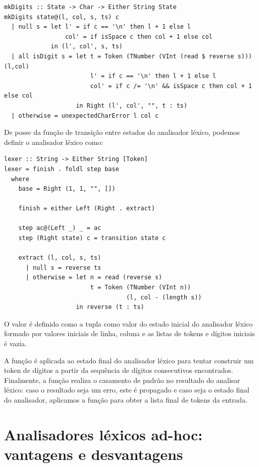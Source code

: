\begin{verbatim}
mkDigits :: State -> Char -> Either String State
mkDigits state@(l, col, s, ts) c
  | null s = let l' = if c == '\n' then l + 1 else l
                 col' = if isSpace c then col + 1 else col
             in (l', col', s, ts)
  | all isDigit s = let t = Token (TNumber (VInt (read $ reverse s))) (l,col)
                        l' = if c == '\n' then l + 1 else l
                        col' = if c /= '\n' && isSpace c then col + 1 else col
                    in Right (l', col', "", t : ts)
  | otherwise = unexpectedCharError l col c
\end{verbatim}

De posse da função de transição entre estados do analisador léxico,
podemos definir o analisador léxico como:

\begin{verbatim}
lexer :: String -> Either String [Token]
lexer = finish . foldl step base
  where
    base = Right (1, 1, "", [])

    finish = either Left (Right . extract)

    step ac@(Left _) _ = ac
    step (Right state) c = transition state c

    extract (l, col, s, ts)
      | null s = reverse ts
      | otherwise = let n = read (reverse s)
                        t = Token (TNumber (VInt n))
                                  (l, col - (length s))
                    in reverse (t : ts)
\end{verbatim}

O valor  é definido como a tupla
 como valor do estado inicial
do analisador léxico formado por valores iniciais de linha, coluna e
as listas de tokens e dígitos iniciais é vazia.

A função  é aplicada ao estado final
do analisador léxico para tentar construir um token de dígitos a
partir da sequência de dígitos consecutivos encontrados. Finalmente,
a função  realiza o casamento de
padrão no resultado do analisar léxico: caso o resultado seja um
erro, este é propagado e caso seja o estado final do analisador,
aplicamos a função  para obter a
lista final de tokens da entrada.

\section{Analisadores léxicos ad-hoc: vantagens e
desvantagens}

